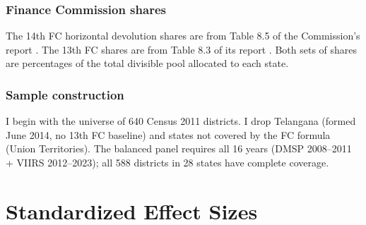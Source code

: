 \documentclass[12pt]{article}
\begin{document}
\subsubsection*{Finance Commission shares} The 14th FC horizontal devolution shares are from Table 8.5 of the Commission's report \citep{fc14report}. The 13th FC shares are from Table 8.3 of its report \citep{fc13report}. Both sets of shares are percentages of the total divisible pool allocated to each state.

\subsubsection*{Sample construction} I begin with the universe of 640 Census 2011 districts. I drop Telangana (formed June 2014, no 13th FC baseline) and states not covered by the FC formula (Union Territories). The balanced panel requires all 16 years (DMSP 2008--2011 + VIIRS 2012--2023); all 588 districts in 28 states have complete coverage.

\section{Standardized Effect Sizes}
\label{sec:sde}


\end{document}
